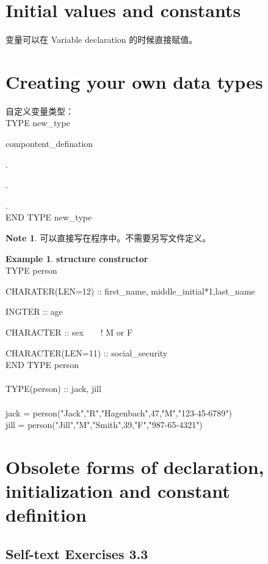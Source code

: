 \documentclass[a4paper,titlepage]{report}
\theoremstyle{definition}
\newtheorem{note}{Note}
\newtheorem{example}{Example}
\begin{document}
\section{Initial values and constants}

变量可以在 Variable declaration 的时候直接赋值。

\section{Creating your own data types}

\noindent 
自定义变量类型： \\
TYPE new\_type \par
\setlength{\parindent}{3.5ex}
compontent\_defination \par
. \par
. \par
. \\
END TYPE new\_type

\begin{note}
可以直接写在程序中。不需要另写文件定义。
\end{note}

\begin{example}
\textbf{structure constructor} \\
TYPE person \par
CHARATER(LEN=12) :: first\_name, middle\_initial*1,last\_name \par
INGTER :: age \par
CHARACTER :: sex\ \ \ \ ! M or F \par
CHARACTER(LEN=11) ::  social\_security \\
END TYPE person \\
\\
TYPE(person) :: jack, jill \\
\\
jack = person("Jack","R","Hagenbach",47,"M","123-45-6789") \\
jill = person("Jill","M","Smith",39,"F","987-65-4321")
\end{example}

\section{Obsolete forms of declaration, initialization and constant definition}

\subsection*{Self-text Exercises 3.3}
\end{document}
